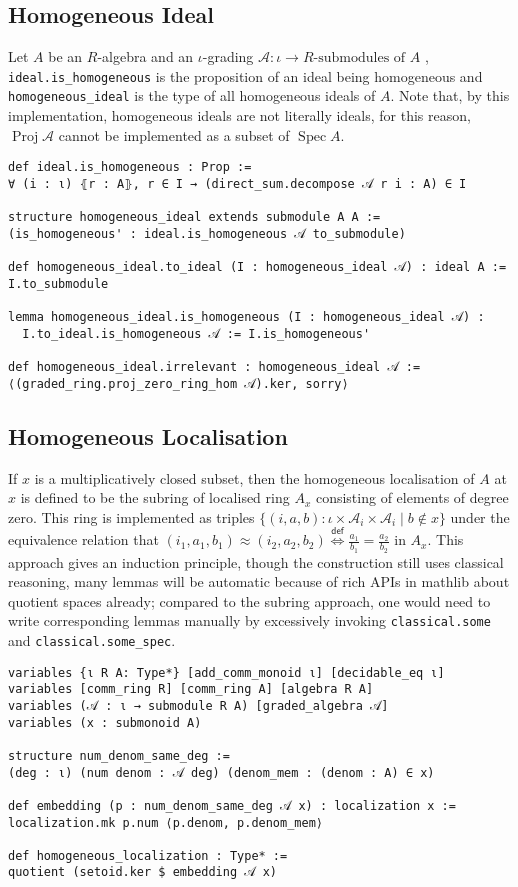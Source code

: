 \documentclass[a4paper,UKenglish,cleveref, autoref, thm-restate]{lipics-v2021}
\begin{document}
\subsection{Homogeneous Ideal}
Let $A$ be an $R$-algebra and an $\iota$-grading $\mathcal{A} : \iota\to R\text{-submodules of~} A$ \cite{wieser2022graded}, \lstinline{ideal.is_homogeneous} is the proposition of an ideal being homogeneous and \lstinline{homogeneous_ideal} is the type of all homogeneous ideals of $A$. Note that, by this implementation, homogeneous ideals are not literally ideals, for this reason, $\operatorname{Proj} \mathcal{A}$ cannot be implemented as a subset of $\operatorname{Spec} A$.
\begin{lstlisting}
def ideal.is_homogeneous : Prop :=
∀ (i : ι) ⦃r : A⦄, r ∈ I → (direct_sum.decompose 𝒜 r i : A) ∈ I

structure homogeneous_ideal extends submodule A A :=
(is_homogeneous' : ideal.is_homogeneous 𝒜 to_submodule)

def homogeneous_ideal.to_ideal (I : homogeneous_ideal 𝒜) : ideal A := I.to_submodule

lemma homogeneous_ideal.is_homogeneous (I : homogeneous_ideal 𝒜) :
  I.to_ideal.is_homogeneous 𝒜 := I.is_homogeneous'

def homogeneous_ideal.irrelevant : homogeneous_ideal 𝒜 :=
⟨(graded_ring.proj_zero_ring_hom 𝒜).ker, sorry⟩
\end{lstlisting}

\subsection{Homogeneous Localisation}
If $x$ is a multiplicatively closed subset, then the homogeneous localisation of $A$ at $x$ is defined to be the subring of localised ring $A_x$ consisting of elements of degree zero. This ring is implemented as triples $\{(i, a, b) : \iota\times \mathcal{A}_i\times \mathcal{A}_i\mid b\not\in x\}$ under the equivalence relation that $(i_1, a_1, b_1)\approx(i_2, a_2, b_2)\stackrel{\mathsf{def}}{\iff}\frac {a_1}{b_1} = \frac{a_2}{b_2}$ in $A_x$. This approach gives an induction principle, though the construction still uses classical reasoning, many lemmas will be automatic because of rich APIs in \textsf{mathlib} about quotient spaces already; compared to the subring approach, one would need to write corresponding lemmas manually by excessively invoking \lstinline{classical.some} and \lstinline{classical.some_spec}.

\begin{lstlisting}
variables {ι R A: Type*} [add_comm_monoid ι] [decidable_eq ι]
variables [comm_ring R] [comm_ring A] [algebra R A]
variables (𝒜 : ι → submodule R A) [graded_algebra 𝒜]
variables (x : submonoid A)

structure num_denom_same_deg :=
(deg : ι) (num denom : 𝒜 deg) (denom_mem : (denom : A) ∈ x)

def embedding (p : num_denom_same_deg 𝒜 x) : localization x :=
localization.mk p.num ⟨p.denom, p.denom_mem⟩

def homogeneous_localization : Type* :=
quotient (setoid.ker $ embedding 𝒜 x)
\end{lstlisting}
\end{document}
